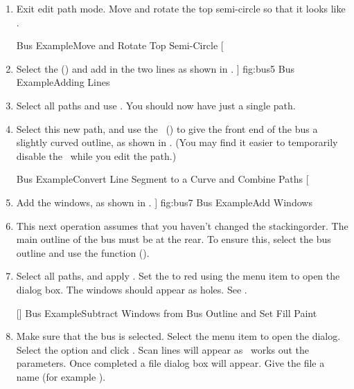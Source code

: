 \begin{enumerate}
[]
{
 {fig:bus3a}{}{},
 {fig:bus3b}{}{}
}
{Bus Example\dash Break the Path}

\item Exit edit path mode. Move and rotate the top semi-circle
so that it looks like .

{}
{Bus Example\dash Move and Rotate Top Semi-Circle}
[
  \item Select the  () and
  add in the two lines as shown in .
]
{fig:bus5}
{}
{Bus Example\dash Adding Lines}

\item Select all paths and use .
You should now have just a single \gls{path}.

\item Select this new \gls{path}, and use the
\editpathmode\ () to give the
front end of the bus a slightly curved outline, as
shown in . (You may find it easier to temporarily
disable the \gridlock\ while you edit the path.)

{}
{Bus Example\dash Convert Line Segment to a Curve and Combine Paths}
[
   \item Add the windows, as shown in .
]
{fig:bus7}
{}
{Bus Example\dash Add Windows}

\item This next operation assumes that you haven't changed the
\gls{stackingorder}. The main outline of the bus must be at the
rear. To ensure this, select the bus outline and use the
 function ().

\item Select all paths, and apply .  Set
the  to red using the 
menu item to open the  dialog box.  The windows
should appear as holes. See .

[]
{}
{Bus Example\dash Subtract Windows from Bus Outline and Set
Fill Paint}

\item Make sure that the bus is selected. Select the
 menu item to open the 
dialog. Select the  option and click
. Scan lines will appear as \FlowframTk\
works out the parameters. Once completed a file dialog box will
appear. Give the file a name (for example \filefmt{busshape.tex}).


\end{enumerate}
